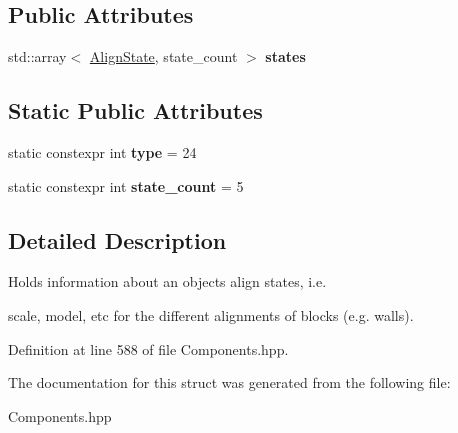 \subsection*{Public Attributes}
\begin{DoxyCompactItemize}
\item 
std\+::array$<$ \hyperlink{struct_align_component_1_1_align_state}{Align\+State}, state\+\_\+count $>$ {\bfseries states}\hypertarget{struct_align_component_a173543907cd141718dfb844b613abcb4}{}\label{struct_align_component_a173543907cd141718dfb844b613abcb4}

\end{DoxyCompactItemize}
\subsection*{Static Public Attributes}
\begin{DoxyCompactItemize}
\item 
static constexpr int {\bfseries type} = 24\hypertarget{struct_align_component_a0f9de2f94f3dd0212d74e71a56cbb411}{}\label{struct_align_component_a0f9de2f94f3dd0212d74e71a56cbb411}

\item 
static constexpr int {\bfseries state\+\_\+count} = 5\hypertarget{struct_align_component_ab553baa3b9884a4c9338cd66e1ab9e24}{}\label{struct_align_component_ab553baa3b9884a4c9338cd66e1ab9e24}

\end{DoxyCompactItemize}


\subsection{Detailed Description}
Holds information about an objects align states, i.\+e. 

scale, model, etc for the different alignments of blocks (e.\+g. walls). 

Definition at line 588 of file Components.\+hpp.



The documentation for this struct was generated from the following file\+:\begin{DoxyCompactItemize}
\item 
Components.\+hpp\end{DoxyCompactItemize}
